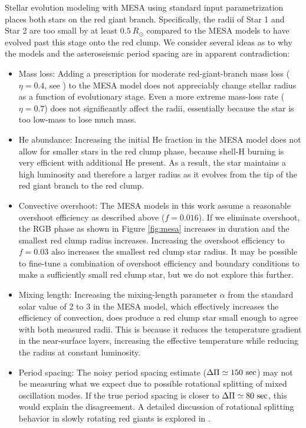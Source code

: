 Stellar evolution modeling with MESA using standard input parametrization places both stars on the red giant branch. Specifically, the radii of Star 1 and Star 2 are too small by at least $0.5 \ R_\odot$ compared to the MESA models to have evolved past this stage onto the red clump. We consider several ideas as to why the models and the asteroseismic period spacing are in apparent contradiction:
\begin{itemize}
\item Mass loss: Adding a prescription for moderate red-giant-branch mass loss ($\eta = 0.4$, see \citealt{mig12}) to the MESA model does not appreciably change stellar radius as a function of evolutionary stage. Even a more extreme mass-loss rate ($\eta = 0.7$) does not significantly affect the radii, essentially because the star is too low-mass to lose much mass.
\item He abundance: Increasing the initial He fraction in the MESA model does not allow for smaller stars in the red clump phase, because shell-H burning is very efficient with additional He present. As a result, the star maintains a high luminosity and therefore a larger radius as it evolves from the tip of the red giant branch to the red clump.
\item Convective overshoot: The MESA models in this work assume a reasonable overshoot efficiency as described above ($f = 0.016$). If we eliminate overshoot, the RGB phase as shown in Figure \ref{fig:mesa} increases in duration and the smallest red clump radius increases. Increasing the overshoot efficiency to $f = 0.03$ also increases the smallest red clump star radius. It may be possible to fine-tune a combination of overshoot efficiency and boundary conditions to make a sufficiently small red clump star, but we do not explore this further.
\item Mixing length: Increasing the mixing-length parameter $\alpha$ from the standard solar value of 2 to 3 in the MESA model, which effectively increases the efficiency of convection, does produce a red clump star small enough to agree with both measured radii. This is because it reduces the temperature gradient in the near-surface layers, increasing the effective temperature while reducing the radius at constant luminosity. 
\item Period spacing: The noisy period spacing estimate ($\Delta \Pi \simeq 150 \ \rm{sec}$) may not be measuring what we expect due to possible rotational splitting of mixed oscillation modes. If the true period spacing is closer to $\Delta \Pi \simeq 80 \ \rm{sec}$, this would explain the disagreement. A detailed discussion of rotational splitting behavior in slowly rotating red giants is explored in \citet{gou13}.
\end{itemize}
  
  
  